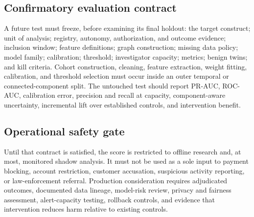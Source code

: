\subsection{Confirmatory evaluation contract}

A future test must freeze, before examining its final holdout: the target
construct; unit of analysis; registry, autonomy, authorization, and outcome
evidence; inclusion window; feature definitions; graph construction; missing
data policy; model family; calibration; threshold; investigator capacity;
metrics; benign twins; and kill criteria.  Cohort construction, cleaning,
feature extraction, weight fitting, calibration, and threshold selection must
occur inside an outer temporal or connected-component split.  The untouched
test should report PR-AUC, ROC-AUC, calibration error, precision and recall at
capacity, component-aware uncertainty, incremental lift over established
controls, and intervention benefit.

\subsection{Operational safety gate}

Until that contract is satisfied, the score is restricted to offline research
and, at most, monitored shadow analysis.  It must not be used as a sole input
to payment blocking, account restriction, customer accusation, suspicious
activity reporting, or law-enforcement referral.  Production consideration
requires adjudicated outcomes, documented data lineage, model-risk review,
privacy and fairness assessment, alert-capacity testing, rollback controls, and
evidence that intervention reduces harm relative to existing controls.
